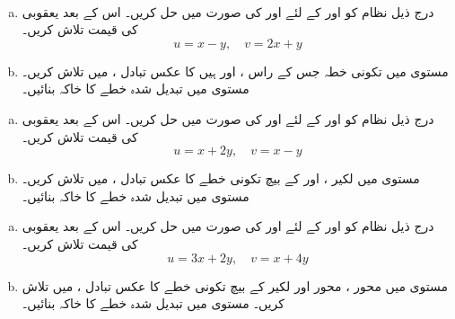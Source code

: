 \\
\begin{enumerate}[a.]
\item
درج ذیل نظام کو  اور  کے لئے  اور  کی صورت میں حل کریں۔ اس کے بعد یعقوبی  کی قیمت تلاش کریں۔
\[u=x-y,\quad v=2x+y\]
\item
مستوی  میں تکونی خطہ جس کے راس ،  اور  ہیں  کا عکس تبادل ،  میں تلاش کریں۔ مستوی  میں تبدیل شدہ  خطے کا خاکہ بنائیں۔
\end{enumerate}
\begin{enumerate}[a.]
\item
درج ذیل نظام کو  اور  کے لئے  اور  کی صورت میں حل کریں۔ اس کے بعد یعقوبی  کی قیمت تلاش کریں۔
\[u=x+2y,\quad v=x-y\]
\item
مستوی  میں  لکیر  ،  اور  کے بیچ  تکونی خطے   کا عکس تبادل ،  میں تلاش کریں۔ مستوی  میں تبدیل شدہ  خطے کا خاکہ بنائیں۔

\end{enumerate}
\begin{enumerate}[a.]
\item
درج ذیل نظام کو  اور  کے لئے  اور  کی صورت میں حل کریں۔ اس کے بعد یعقوبی  کی قیمت تلاش کریں۔
\[u=3x+2y,\quad v=x+4y\]
\item
مستوی  میں محور   ، محور   اور لکیر   کے بیچ  تکونی خطے   کا عکس تبادل ،  میں تلاش کریں۔ مستوی  میں تبدیل شدہ  خطے کا خاکہ بنائیں۔
\end{enumerate}
